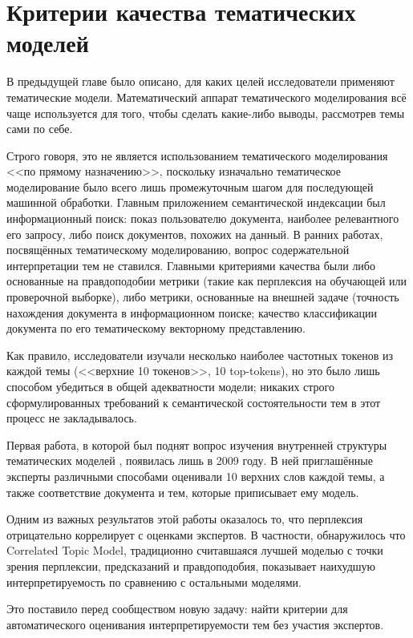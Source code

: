 \chapter{Критерии качества тематических моделей}
\label{chap:metrics}


В предыдущей главе было описано, для каких целей исследователи применяют тематические модели. Математический аппарат тематического моделирования всё чаще используется для того, чтобы сделать какие-либо выводы, рассмотрев темы сами по себе.

Строго говоря, это не является использованием тематического моделирования <<по прямому назначению>>, поскольку изначально тематическое моделирование было всего лишь промежуточным шагом для последующей машинной обработки. Главным приложением семантической индексации был информационный поиск: показ пользователю документа, наиболее релевантного его запросу, либо поиск документов, похожих на данный.
В ранних работах, посвящённых тематическому моделированию, вопрос содержательной интерпретации тем не ставился. Главными критериями качества были либо основанные на правдоподобии метрики (такие как перплексия на обучающей или проверочной выборке), либо метрики, основанные на внешней задаче (точность нахождения документа в информационном поиске; качество классификации документа по его тематическому векторному представлению.

Как правило, исследователи изучали несколько наиболее частотных токенов из каждой темы (<<верхние 10 токенов>>, 10 top-tokens), но это было лишь способом убедиться в общей адекватности модели; никаких строго сформулированных требований к семантической состоятельности тем в этот процесс не закладывалось.

Первая работа, в которой был поднят вопрос изучения внутренней структуры тематических моделей \cite{rtl}, появилась лишь в 2009 году. В ней приглашённые эксперты различными способами оценивали 10 верхних слов каждой темы, а также соответствие документа и тем, которые приписывает ему модель.

Одним из важных результатов этой работы оказалось то, что перплексия отрицательно коррелирует с оценками экспертов. В частности, обнаружилось что Correlated Topic Model, традиционно считавшаяся лучшей моделью с точки зрения перплексии, предсказаний и правдоподобия, показывает наихудшую интерпретируемость по сравнению с остальными моделями.

Это поставило перед сообществом новую задачу: найти критерии для автоматического оценивания интерпретируемости тем без участия экспертов.


